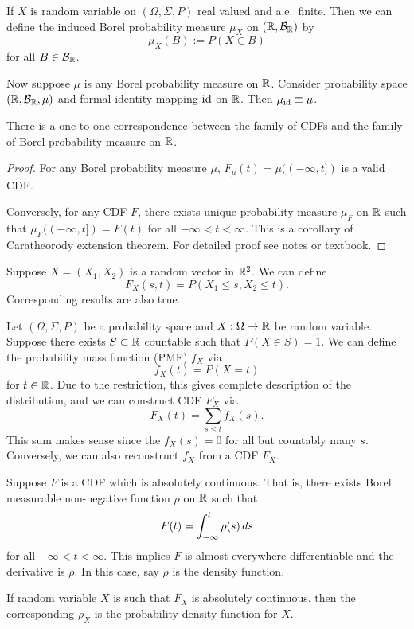 \documentclass[a4paper]{article}
\begin{document}
\begin{defi}
  If $X$ is random variable on $(\Omega, \Sigma, P)$ real valued and a.e.\ finite.
  Then we can define the induced Borel probability measure
  $\mu_X$ on $(\mathbb{R}, \mathcal{B}_{\mathbb{R}})$ by
  \[
    \mu_X (B) := P \left( X \in B \right)
  \]
  for all $B \in \mathcal{B}_{\mathbb{R}}$.
\end{defi}

Now suppose $\mu$ is any Borel probability measure on $\mathbb{R}$. Consider
probability space $(\mathbb{R}, \mathcal{B}_{\mathbb{R}}, \mu)$ and formal identity mapping
$\operatorname{id}$ on $\mathbb{R}$. Then $\mu_{\operatorname{id}} \equiv \mu$.

\begin{thm}
  There is a one-to-one correspondence between the family of CDFs
  and the family of Borel probability measure on $\mathbb{R}$.
\end{thm}

\begin{proof}
  For any Borel probability measure $\mu$,
  $F_\mu (t) = \mu((-\infty, t])$
  is a valid CDF.

  Conversely, for any CDF $F$, there exists unique probability
  measure $\mu_F$ on $\mathbb{R}$ such that $\mu_F ((-\infty, t]) = F(t)$
  for all $-\infty < t < \infty$. This is a corollary of Caratheorody
  extension theorem. For detailed proof see notes or textbook.

\end{proof}

\begin{remark}
  Suppose $X = (X_1, X_2)$ is a random vector in $\mathbb{R}^2$. We can
  define
  \[
    F_X (s, t) = P \left( X_1 \leq s, X_2 \leq t \right).
  \]
  Corresponding results are also true.
\end{remark}

\begin{defi}
  Let $(\Omega, \Sigma, P)$ be a probability space and $X: \Omega
    \to \mathbb{R}$ be random variable. Suppose there exists $S \subset \mathbb{R}$ countable
  such that $P \left( X \in S \right) = 1$. We can define
  the probability mass function (PMF) $f_X$ via
  \[
    f_X (t) = P \left( X = t \right)
  \]
  for $t \in \mathbb{R}$. Due to the restriction, this gives complete description
  of the distribution, and we can construct CDF $F_X$ via
  \[
    F_X (t) = \sum_{s \leq t} f_X (s).
  \]
  This sum makes sense since the $f_X (s) = 0$ for all but countably many
  $s$.
  Conversely, we can also reconstruct $f_X$ from a CDF $F_X$.
\end{defi}

\begin{defi}
  Suppose $F$ is a CDF which is absolutely continuous. That is,
  there exists Borel measurable non-negative function $\rho$ on $\mathbb{R}$
  such that
  \[
    F(t) = \int_{-\infty}^t \rho (s) \, d s
  \]
  for all $-\infty < t < \infty$.
  This implies $F$ is almost everywhere differentiable and the derivative
  is $\rho$. In this case, say $\rho$ is the density function.

  If random variable $X$ is such that $F_X$ is absolutely continuous, then the
  corresponding $\rho_X$ is the probability density function for $X$.
\end{defi}
\end{document}
